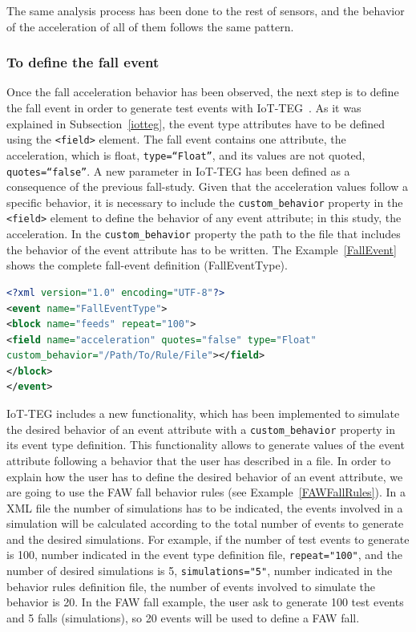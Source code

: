 \documentclass[review]{elsarticle}
\begin{document}
The same analysis process has been done to the rest of sensors, and the behavior of the acceleration of all of them follows the same pattern.

\subsubsection*{To define the fall event} Once the fall acceleration behavior has been observed, the next step is to define the 
fall event in order to generate test events with IoT-TEG~\cite{TesisGutierrez2017,Gutierrez2017}. As it was explained in 
Subsection~\ref{iotteg}, the event type attributes have
to be defined using the \texttt{<field>} element. The fall event contains one attribute, the acceleration, which is float, 
\texttt{type=``Float''}, and its values are not quoted, \texttt{quotes=``false''}. A new parameter in IoT-TEG has been defined as a 
consequence of the previous fall-study. Given that the acceleration values follow a specific behavior, it is necessary to include 
the \texttt{custom\_behavior} property in the \texttt{<field>} element to define the behavior of any event attribute; 
in this study, the acceleration. In the \texttt{custom\_behavior} property the path to the file that includes the behavior of the 
event attribute has to be written. The Example~\ref{FallEvent} shows the complete fall-event definition (FallEventType).

\begin{lstlisting}[basicstyle=\ttfamily\footnotesize,language=XML,caption={Fall event type definition},label=FallEvent]
<?xml version="1.0" encoding="UTF-8"?>
<event name="FallEventType">
<block name="feeds" repeat="100">
<field name="acceleration" quotes="false" type="Float" 
custom_behavior="/Path/To/Rule/File"></field>
</block>
</event>
\end{lstlisting}

IoT-TEG includes a new functionality, which has been implemented to simulate the desired behavior of an event attribute with a \texttt{custom\_behavior} property in its event type definition. This functionality allows to generate values of the event attribute following a behavior that the user has described in a file.
In order to explain how the user has to define the desired behavior of an event attribute, we are going to use the FAW fall behavior rules (see Example~\ref{FAWFallRules}). In a XML file the number of simulations has to be
indicated, the events involved in a simulation will be calculated according to the total number of events to generate and the desired simulations. For example, if the number of test events to generate is 100, number indicated in the event type definition file, \texttt{repeat="100"}, and the number of desired 
simulations is 5, \texttt{simulations="5"}, number indicated in the behavior rules definition file, the number of events involved to simulate the behavior is 20. In the FAW fall example, the user ask to generate 100 test events and 5 falls (simulations), so 20 events will be used to define a FAW fall.
\end{document}
